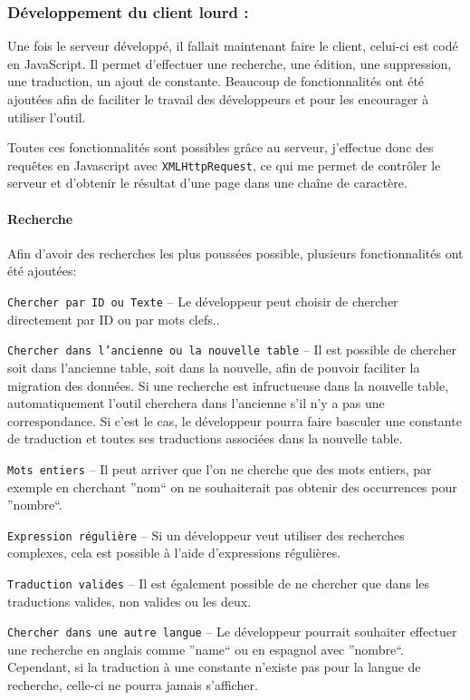         \subsubsection{Développement du client lourd : \mlanguage{}}
        Une fois le serveur développé, il fallait maintenant faire le client, celui-ci est codé en JavaScript. Il permet d'effectuer une recherche, une édition, une suppression, une traduction, un ajout de constante. Beaucoup de fonctionnalités ont été ajoutées afin de faciliter le travail des développeurs et pour les encourager à utiliser l'outil.

        Toutes ces fonctionnalités sont possibles grâce au serveur, j'effectue donc des requêtes en Javascript avec \texttt{XMLHttpRequest}, ce qui me permet de contrôler le serveur et d'obtenir le résultat d'une page dans une chaîne de caractère.

        \paragraph{Recherche}
            Afin d'avoir des recherches les plus poussées possible, plusieurs fonctionnalités ont été ajoutées:

            \texttt{Chercher par ID ou Texte} -- Le développeur peut choisir de chercher directement par ID ou par mots clefs..

            \texttt{Chercher dans l'ancienne ou la nouvelle table} -- Il est possible de chercher soit dans l'ancienne table, soit dans la nouvelle, afin de pouvoir faciliter la migration des données. Si une recherche est infructueuse dans la nouvelle table, automatiquement l'outil cherchera dans l'ancienne s'il n'y a pas une correspondance. Si c'est le cas, le développeur pourra faire basculer une constante de traduction et toutes ses traductions associées dans la nouvelle table.

            \texttt{Mots entiers} -- Il peut arriver que l'on ne cherche que des mots entiers, par exemple en cherchant ''nom`` on ne souhaiterait pas obtenir des occurrences pour ''nombre``.

            \texttt{Expression régulière} -- Si un développeur veut utiliser des recherches complexes, cela est possible à l'aide d'expressions régulières.

            \texttt{Traduction valides} -- Il est également possible de ne chercher que dans les traductions valides, non valides ou les deux.

            \texttt{Chercher dans une autre langue} -- Le développeur pourrait souhaiter effectuer une recherche en anglais comme ''name`` ou en espagnol avec ''nombre``. Cependant, si la traduction à une constante n'existe pas pour la langue de recherche, celle-ci ne pourra jamais s'afficher.


